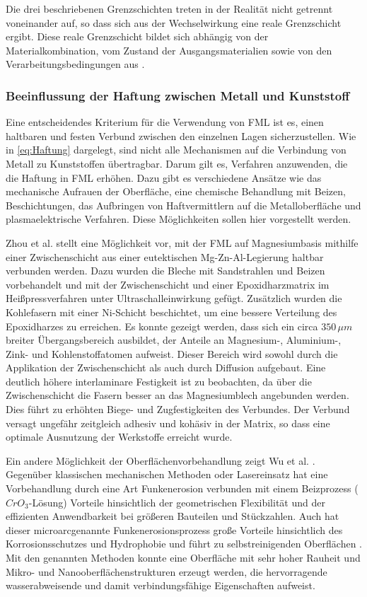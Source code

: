 Die drei beschriebenen Grenzschichten treten in der Realität nicht getrennt voneinander auf, so dass sich aus der Wechselwirkung eine reale Grenzschicht ergibt.
Diese reale Grenzschicht bildet sich abhängig von der Materialkombination, vom Zustand der Ausgangsmaterialien sowie von den Verarbeitungsbedingungen aus \cite{Flock.2012}.

\subsubsection{Beeinflussung der Haftung zwischen Metall und Kunststoff}\label{sec:beeinflussung}

Eine entscheidendes Kriterium für die Verwendung von FML ist es, einen haltbaren und festen Verbund zwischen den einzelnen Lagen sicherzustellen.
Wie in \autoref{eq:Haftung} dargelegt, sind nicht alle Mechanismen auf die Verbindung von Metall zu Kunststoffen übertragbar.
Darum gilt es, Verfahren anzuwenden, die die Haftung in FML erhöhen.
Dazu gibt es verschiedene Ansätze wie das mechanische Aufrauen der Oberfläche, eine chemische Behandlung mit Beizen, Beschichtungen, das Aufbringen von Haftvermittlern auf die Metalloberfläche und plasmaelektrische Verfahren.
Diese Möglichkeiten sollen hier vorgestellt werden.

Zhou et al. \cite{Zhou.2021} stellt eine Möglichkeit vor, mit der FML auf Magnesiumbasis mithilfe einer Zwischenschicht aus einer eutektischen Mg-Zn-Al-Legierung haltbar verbunden werden.
Dazu wurden die Bleche mit Sandstrahlen und Beizen vorbehandelt und mit der Zwischenschicht und einer Epoxidharzmatrix im Heißpressverfahren unter Ultraschalleinwirkung gefügt.
Zusätzlich wurden die Kohlefasern mit einer Ni-Schicht beschichtet, um eine bessere Verteilung des Epoxidharzes zu erreichen.
Es konnte gezeigt werden, dass sich ein circa $350 \, \mu m$ breiter Übergangsbereich ausbildet, der Anteile an Magnesium-, Aluminium-, Zink- und Kohlenstoffatomen aufweist.
Dieser Bereich wird sowohl durch die Applikation der Zwischenschicht als auch durch Diffusion aufgebaut.
Eine deutlich höhere interlaminare Festigkeit ist zu beobachten, da über die Zwischenschicht die Fasern besser an das Magnesiumblech angebunden werden.
Dies führt zu erhöhten Biege- und Zugfestigkeiten des Verbundes.
Der Verbund versagt ungefähr zeitgleich adhesiv und kohäsiv in der Matrix, so dass eine optimale Ausnutzung der Werkstoffe erreicht wurde.

Ein andere Möglichkeit der Oberflächenvorbehandlung zeigt Wu et al. \cite{Wu.2016}.
Gegenüber klassischen mechanischen Methoden oder Lasereinsatz hat eine Vorbehandlung durch eine Art Funkenerosion verbunden mit einem Beizprozess ($CrO_3$-Lösung) Vorteile hinsichtlich der geometrischen Flexibilität und der effizienten Anwendbarkeit bei größeren Bauteilen und Stückzahlen.
Auch hat dieser \glqq microarc\grqq genannte Funkenerosionsprozess große Vorteile hinsichtlich des Korrosionsschutzes und Hydrophobie und führt zu selbstreinigenden Oberflächen \cite{Lu.2015}.
Mit den genannten Methoden konnte eine Oberfläche mit sehr hoher Rauheit und Mikro- und Nanooberflächenstrukturen erzeugt werden, die hervorragende wasserabweisende und damit verbindungsfähige Eigenschaften aufweist.

